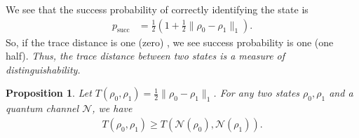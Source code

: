 \documentclass[notoc]{tufte-book}
\newtheorem{proposition}[theorem]{Proposition}
\begin{document}
We see that the success probability of correctly identifying the state is
\begin{align}
    p_{\text{succ}} &= \frac{1}{2} (1+ \frac{1}{2} \|\rho_0-\rho_1 \|_1).
\end{align}
So, if the trace distance is one (zero) , we see success probability is one (one half). \textit{Thus, the trace distance between two states is a measure of distinguishability. } 

\begin{tcolorbox}[colframe=white,breakable, colback=black!5, arc=0pt, outer arc=0pt]
\begin{proposition}
Let $T(\rho_0, \rho_1) = \frac{1}{2} \|\rho_0 - \rho_1\|_1$. For any two states $\rho_0, \rho_1$ and a quantum channel $\mathcal{N}$, we have
\begin{align}
    T(\rho_0,\rho_1) \geq T(\mathcal{N}(\rho_0),\mathcal{N}(\rho_1)).
\end{align}
\end{proposition}
\end{tcolorbox}
\end{document}
